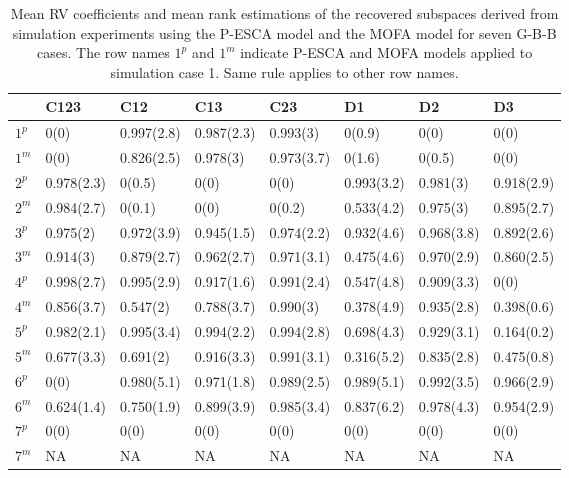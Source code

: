 \begin{table}[htbp]
\small
\centering
\caption{Mean RV coefficients and mean rank estimations of the recovered subspaces derived from simulation experiments using the P-ESCA model and the MOFA model for seven G-B-B cases. The row names $1^p$ and $1^m$ indicate P-ESCA and MOFA models applied to simulation case 1. Same rule applies to other row names.}
\label{chapter5_tab:4}
\begin{tabular}{llllllll}
  \toprule
 & C123 & C12 & C13 & C23 & D1 & D2 & D3 \\
  \midrule
 $1^{p}$  & 0(0)        & 0.997(2.8)   & 0.987(2.3)   & 0.993(3) & 0(0.9)     & 0(0)       & 0(0) \\
 $1^{m}$  & 0(0)        & 0.826(2.5)   & 0.978(3)   & 0.973(3.7) & 0(1.6)     & 0(0.5)     & 0(0) \\
 \hline
 $2^{p}$  & 0.978(2.3)  & 0(0.5)       & 0(0)       & 0(0)       & 0.993(3.2) & 0.981(3) & 0.918(2.9) \\
 $2^{m}$  & 0.984(2.7)  & 0(0.1)       & 0(0)       & 0(0.2)     & 0.533(4.2) & 0.975(3) & 0.895(2.7) \\
 \hline
 $3^{p}$  & 0.975(2)  & 0.972(3.9)   & 0.945(1.5)   & 0.974(2.2) & 0.932(4.6)   & 0.968(3.8)   & 0.892(2.6) \\
 $3^{m}$  & 0.914(3)  & 0.879(2.7)   & 0.962(2.7)   & 0.971(3.1) & 0.475(4.6)   & 0.970(2.9)   & 0.860(2.5) \\
 \hline
 $4^{p}$  & 0.998(2.7)  & 0.995(2.9)     & 0.917(1.6)     & 0.991(2.4)   & 0.547(4.8)   & 0.909(3.3)   & 0(0) \\
 $4^{m}$  & 0.856(3.7)  & 0.547(2)     & 0.788(3.7)     & 0.990(3)   & 0.378(4.9)   & 0.935(2.8)   & 0.398(0.6)   \\
 \hline
 $5^{p}$  & 0.982(2.1)  & 0.995(3.4)     & 0.994(2.2)     & 0.994(2.8)   & 0.698(4.3)   & 0.929(3.1) & 0.164(0.2)\\
 $5^{m}$  & 0.677(3.3)  & 0.691(2)     & 0.916(3.3)     & 0.991(3.1)   & 0.316(5.2)   & 0.835(2.8) & 0.475(0.8)   \\
 \hline
 $6^{p}$  & 0(0)      & 0.980(5.1)       & 0.971(1.8)     & 0.989(2.5)   & 0.989(5.1)   & 0.992(3.5)   & 0.966(2.9) \\
 $6^{m}$  & 0.624(1.4)  & 0.750(1.9)     & 0.899(3.9)     & 0.985(3.4)   & 0.837(6.2)   & 0.978(4.3)   & 0.954(2.9) \\
 \hline
 $7^{p}$  & 0(0)        & 0(0)         & 0(0)         & 0(0)       & 0(0)       & 0(0)       & 0(0) \\
 $7^{m}$  & NA          & NA           & NA           & NA         & NA         &NA         & NA    \\
  \bottomrule
\end{tabular}
\end{table}

